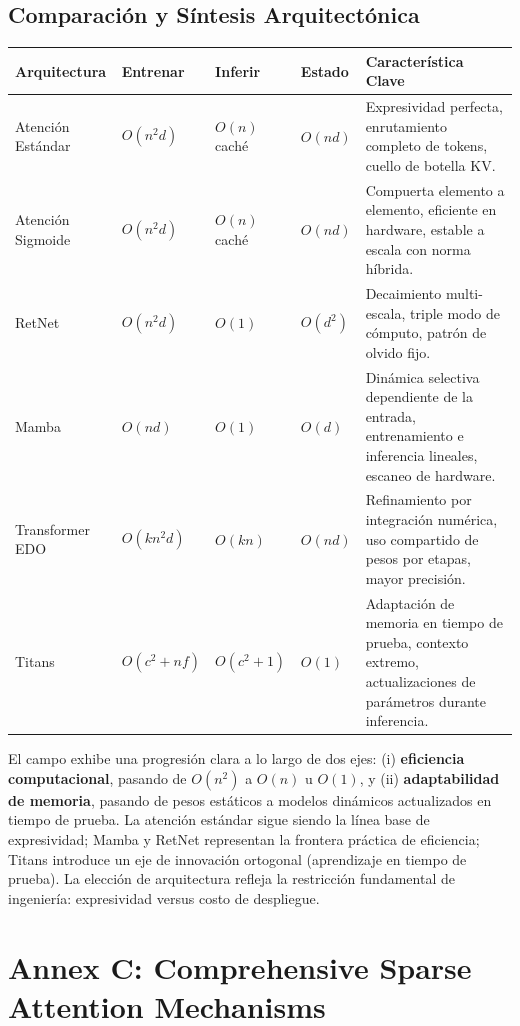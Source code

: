 \documentclass[11pt,a4paper]{article}
\begin{document}
\subsection{Comparación y Síntesis Arquitectónica}

\small
\begin{longtable}{p{2.0cm}p{1.8cm}p{1.6cm}p{1.6cm}p{4.5cm}}
\toprule
\textbf{Arquitectura} & \textbf{Entrenar} & \textbf{Inferir} & \textbf{Estado} & \textbf{Característica Clave} \\
\midrule
\endhead
Atención Estándar & $O(n^2 d)$ & $O(n)$ caché & $O(nd)$ & Expresividad perfecta, enrutamiento completo de tokens, cuello de botella KV. \\
Atención Sigmoide & $O(n^2 d)$ & $O(n)$ caché & $O(nd)$ & Compuerta elemento a elemento, eficiente en hardware, estable a escala con norma híbrida. \\
RetNet & $O(n^2 d)$ & $O(1)$ & $O(d^2)$ & Decaimiento multi-escala, triple modo de cómputo, patrón de olvido fijo. \\
Mamba & $O(nd)$ & $O(1)$ & $O(d)$ & Dinámica selectiva dependiente de la entrada, entrenamiento e inferencia lineales, escaneo de hardware. \\
Transformer EDO & $O(kn^2 d)$ & $O(kn)$ & $O(nd)$ & Refinamiento por integración numérica, uso compartido de pesos por etapas, mayor precisión. \\
Titans & $O(c^2 + nf)$ & $O(c^2 + 1)$ & $O(1)$ & Adaptación de memoria en tiempo de prueba, contexto extremo, actualizaciones de parámetros durante inferencia. \\
\bottomrule
\end{longtable}
\normalsize

El campo exhibe una progresión clara a lo largo de dos ejes: (i) \textbf{eficiencia computacional}, pasando de $O(n^2)$ a $O(n)$ u $O(1)$, y (ii) \textbf{adaptabilidad de memoria}, pasando de pesos estáticos a modelos dinámicos actualizados en tiempo de prueba. La atención estándar sigue siendo la línea base de expresividad; Mamba y RetNet representan la frontera práctica de eficiencia; Titans introduce un eje de innovación ortogonal (aprendizaje en tiempo de prueba). La elección de arquitectura refleja la restricción fundamental de ingeniería: expresividad versus costo de despliegue.

\section{Annex C: Comprehensive Sparse Attention Mechanisms}
\label{sec:annex-sparse}
\end{document}

